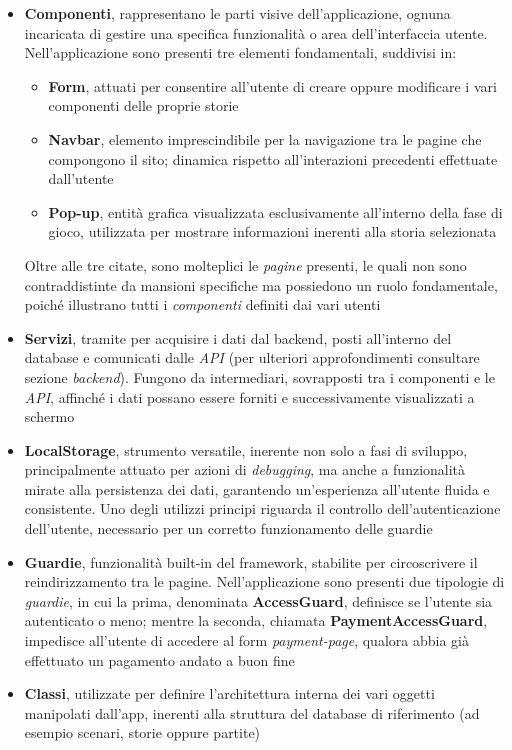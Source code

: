 \documentclass{article}
\begin{document}
\begin{itemize}[label = {-}]
    \itemsep0em
    \item \textbf{Componenti}, rappresentano le parti visive dell'applicazione, ognuna incaricata di gestire una specifica funzionalità o area dell'interfaccia utente. Nell'applicazione sono presenti tre elementi fondamentali, suddivisi in: 
    \begin{itemize}[label = {-}]
        \itemsep0em
        \item \textbf{Form}, attuati per consentire all'utente di creare oppure modificare i vari componenti delle proprie storie
        \item \textbf{Navbar}, elemento imprescindibile per la navigazione tra le pagine che compongono il sito; dinamica rispetto all'interazioni precedenti effettuate dall'utente
        \item \textbf{Pop-up}, entità grafica visualizzata esclusivamente all'interno della fase di gioco, utilizzata per mostrare informazioni inerenti alla storia selezionata
    \end{itemize}
    Oltre alle tre citate, sono molteplici le \textit{pagine} presenti, le quali non sono contraddistinte da mansioni specifiche ma possiedono un ruolo fondamentale, poiché illustrano tutti i \textit{componenti} definiti dai vari utenti
    \item \textbf{Servizi}, tramite per acquisire i dati dal backend, posti all'interno del database e comunicati dalle \textit{API} (per ulteriori approfondimenti consultare sezione \textit{backend}). Fungono da intermediari, sovrapposti tra i componenti e le \textit{API}, affinché i dati possano essere forniti e successivamente visualizzati a schermo
    \item \textbf{LocalStorage}, strumento versatile, inerente non solo a fasi di sviluppo, principalmente attuato per azioni di \textit{debugging}, ma anche a funzionalità mirate alla persistenza dei dati, garantendo un'esperienza all’utente fluida e consistente. Uno degli utilizzi principi riguarda il controllo dell'autenticazione dell'utente, necessario per un corretto funzionamento delle guardie
    \item \textbf{Guardie}, funzionalità built-in del framework, stabilite per circoscrivere il reindirizzamento tra le pagine. Nell'applicazione sono presenti due tipologie di \textit{guardie}, in cui la prima, denominata \textbf{AccessGuard}, definisce se l'utente sia autenticato o meno; mentre la seconda, chiamata \textbf{PaymentAccessGuard}, impedisce all'utente di accedere al form \textit{payment-page}, qualora abbia già effettuato un pagamento andato a buon fine
    \item \textbf{Classi}, utilizzate per definire l'architettura interna dei vari oggetti manipolati dall'app, inerenti alla struttura del database di riferimento (ad esempio scenari, storie oppure partite)
\end{itemize}
\end{document}
